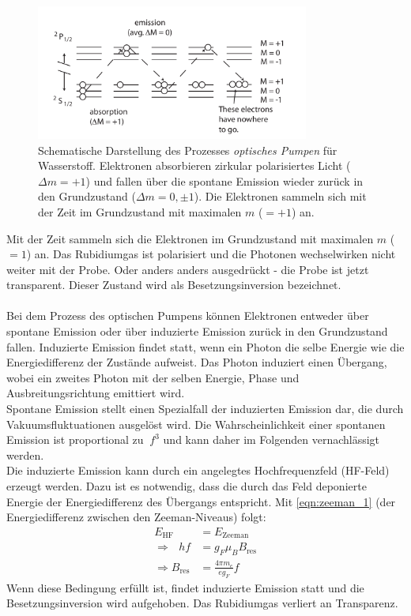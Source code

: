 \begin{figure}
    \centering
    \includegraphics[width=0.8\textwidth]{content/img/optisches_pumpen.png}
    \caption{Schematische Darstellung des Prozesses \textit{optisches Pumpen} für Wasserstoff.
    Elektronen absorbieren zirkular polarisiertes Licht ($\Delta m = +1$) und 
    fallen über die spontane Emission wieder zurück in den Grundzustand ($\Delta m = 0, \pm 1$).
    Die Elektronen sammeln sich mit der Zeit im Grundzustand mit maximalen $m$ ($=+1$) an. \cite{teachspin}
    }
    \label{fig:optisches_pumpen}
\end{figure}
Mit der Zeit sammeln sich die Elektronen im Grundzustand mit maximalen $m$ ($=1$) an.
Das Rubidiumgas ist polarisiert und die Photonen wechselwirken nicht weiter mit der Probe.
Oder anders anders ausgedrückt - die Probe ist jetzt transparent.
Dieser Zustand wird als Besetzungsinversion bezeichnet.
\\
\\
Bei dem Prozess des optischen Pumpens können Elektronen entweder über spontane Emission oder über induzierte Emission zurück in den Grundzustand fallen.
Induzierte Emission findet statt, wenn ein Photon die selbe Energie wie die Energiedifferenz der Zustände aufweist.
Das Photon induziert einen Übergang, wobei ein zweites Photon mit der selben Energie, Phase und Ausbreitungsrichtung emittiert wird.
\\
Spontane Emission stellt einen Spezialfall der induzierten Emission dar, die durch Vakuumsfluktuationen ausgelöst wird.
Die Wahrscheinlichkeit einer spontanen Emission ist proportional zu $~f^3$ und kann daher im Folgenden vernachlässigt werden.
\\
Die induzierte Emission kann durch ein angelegtes Hochfrequenzfeld (HF-Feld) erzeugt werden.
Dazu ist es notwendig, dass die durch das Feld deponierte Energie der Energiedifferenz des Übergangs entspricht.
Mit \autoref{eqn:zeeman_1} (der Energiedifferenz zwischen den Zeeman-Niveaus) folgt:
\begin{align}
    E_\text{HF} &= E_\text{Zeeman} \\
    \Rightarrow \:\:\: h f &= g_F \mu_B B_\text{res} \\
    \Rightarrow B_\text{res} &= \frac{4\pi m_e}{e g_F} f \label{eqn:resonanzfrequenz}
\end{align}
Wenn diese Bedingung erfüllt ist, findet induzierte Emission statt und die Besetzungsinversion wird aufgehoben.
Das Rubidiumgas verliert an Transparenz.


